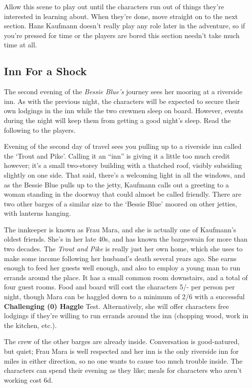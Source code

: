 Allow this scene to play out until the characters run out of things they're
interested in learning about. When they're done, move straight on to the
next section. Hans Kaufmann doesn't really play any role later in the adventure,
so if you're pressed for time or the players are bored this section needn't take
much time at all.

\subsection{Inn For a Shock}\label{act1scene2}
The second evening of the \textit{Bessie Blue's} journey sees her mooring at
a riverside inn. As with the previous night, the characters will be expected to
secure their own lodgings in the inn while the two crewmen sleep on board.
However, events during the night will keep them from getting a good night's
sleep. Read the following to the players.

\begin{callout}
Evening of the second day of travel sees you pulling up to a riverside inn
called the `Trout and Pike'. Calling it an ``inn'' is giving it a little too much
credit however; it's a small two-storey building with a thatched roof, visibly
subsiding slightly on one side. That said, there's a welcoming light in all the
windows, and as the Bessie Blue pulls up to the jetty, Kaufmann calls
out a greeting to a woman standing in the doorway that could almost be called
friendly. There are two other barges of a similar size to the `Bessie Blue'
moored on other jetties, with lanterns hanging.
\end{callout}

The innkeeper is known as Frau Mara, and she is actually one of Kaufmann's
oldest friends. She's in her late 40s, and has known the bargeswain for more
than two decades. The \textit{Trout and Pike} is really just her own home,
which she uses to make some income following her husband's death several years
ago. She earns enough to feed her guests well enough, and also to employ a
young man to run errands around the place. It has a small common room downstairs,
and a total of four guest rooms. Food and board will cost the characters 5/- per
person per night, though Mara can be haggled down to a minimum of 2/6 with a
successful \textbf{Challenging (0) Haggle} Test. Alternatively, she will offer
characters free lodgings if they're willing to run errands around the inn
(chopping wood, work in the kitchen, etc.).

The crew of the other barges are already inside. Conversation is good-natured,
but quiet; Frau Mara is well respected and her inn is the only riverside inn for
miles in either direction, so no one wants to cause too much trouble inside.
The characters can spend their evening as they like; meals for characters who
aren't working cost 6d.

